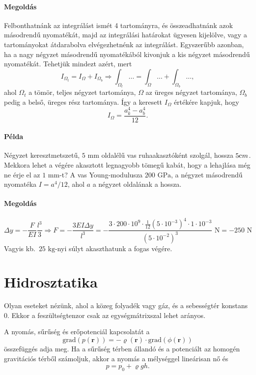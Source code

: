 \documentclass[12pt,a4paper]{scrartcl}
\let\mathbf\bm
\begin{document}
\paragraph{Megoldás}
Felbonthatnánk az integrálást ismét 4 tartományra, és összeadhatnánk azok másodrendű nyomatékát, majd az integrálási határokat ügyesen kijelölve, vagy a tartományokat átdarabolva elvégezhetnénk az integrálást. Egyszerűbb azonban, ha a nagy négyzet másodrendű nyomatékából kivonjuk a kis négyzet másodrendű nyomatékát. Tehetjük mindezt azért, mert
\[{I_{{\Omega _t}}} = {I_\Omega } + {I_{{\Omega _b}}} \Rightarrow \int_{{\Omega _t}}  \ldots   = \int_\Omega   \ldots   + \int_{{\Omega _b}}  \ldots ,\]
ahol ${\Omega _t}$ a tömör, teljes négyzet tartománya, $\Omega$ az üreges négyzet tartománya, $\Omega_b$ pedig a belső, üreges rész tartománya. Így a keresett $I_\Omega$ értékére kapjuk, hogy
\[{I_\Omega } = \frac{{a_k^4 - a_b^4}}{{12}}.\]

\paragraph{Példa}
Négyzet keresztmetszetű, $5{\text{ mm}}$ oldalélű vas ruhaakasztóként szolgál, hossza $5{\text cm}$. Mekkora lehet a végére akasztott legnagyobb tömegű kabát, hogy a lehajlása még ne érje el az $1{\text{ mm}}$-t? A vas Young-modulusza $200{\text{ GPa}}$, a négyzet másodrendű nyomatéka $I = {a^4}/12$, ahol $a$ a négyzet oldalának a hossza.
\paragraph{Megoldás}
\[\Delta y =  - \frac{F}{{EI}}\frac{{{l^3}}}{3} \Rightarrow F =  - \frac{{3EI\Delta y}}{{{l^3}}} =  - \frac{{3 \cdot 200 \cdot {{10}^9} \cdot \frac{1}{{12}}{{\left( {5 \cdot {{10}^{ - 3}}} \right)}^4} \cdot 1 \cdot {{10}^{ - 3}}}}{{{{\left( {5 \cdot {{10}^{ - 2}}} \right)}^3}}}{\text{ N}} =  - 250{\text{ N}}\]
Vagyis kb.\ $25 {\text{ kg}}$-nyi súlyt akaszthatunk a fogas végére.
\normalsize

\section{Hidrosztatika}
Olyan eseteket nézünk, ahol a közeg folyadék vagy gáz, és a sebességtér konstans 0. Ekkor a feszültségtenzor csak az egységmátrixszal lehet arányos.

A nyomás, sűrűség és erőpotenciál kapcsolatát a 
\[{\text{grad}}\left( {p\left( {\mathbf{r}} \right)} \right) =  - \varrho \left( {\mathbf{r}} \right) \cdot {\text{grad}}\left( {\phi \left( {\mathbf{r}} \right)} \right)\]
összefüggés adja meg. Ha a sűrűség térben állandó és a potenciált az homogén gravitációs térből számoljuk, akkor a nyomás a mélységgel lineárisan nő és
\[p = {p_0} + \varrho gh.\]
\end{document}
